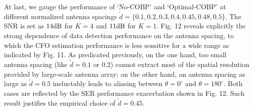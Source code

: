 \documentclass[12pt, draftclsnofoot, onecolumn]{IEEEtran}
\begin{document}
At last, we gauge the performance of `No-COBP' and `Optimal-COBP' at different normalized antenna spacings $\tilde{d} = \{0.1, 0.2, 0.3, 0.4, 0.45, 0.48, 0.5\}$. The SNR is set as $14 \rm{dB}$ for $K=4$ and $11 \rm{dB}$ for $K=1$. Fig. 12 reveals explicitly the strong dependence of data detection performance on the antenna spacing, to which the CFO estimation performance is less sensitive for a wide range as indicated by Fig. 11. As predicated previously, on the one hand, too small antenna spacing (like $\tilde{d} = 0.1$ or $0.2$) cannot extract most of the spatial resolution provided by large-scale antenna array; on the other hand, an antenna spacing as large as $\tilde{d}=0.5$ ineluctably leads to aliasing between $\theta = 0^\circ$ and $\theta = 180^\circ$. Both cases are reflected by the SER performance exacerbation shown in Fig. 12. Such result justifies the empirical choice of $\tilde{d} = 0.45$.
\end{document}
